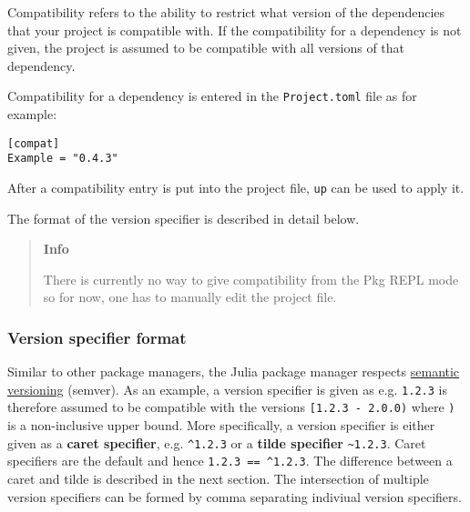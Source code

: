 Compatibility refers to the ability to restrict what version of the dependencies that your project is compatible with. If the compatibility for a dependency is not given, the project is assumed to be compatible with all versions of that dependency.



Compatibility for a dependency is entered in the \texttt{Project.toml} file as for example:




\begin{lstlisting}
[compat]
Example = "0.4.3"
\end{lstlisting}



After a compatibility entry is put into the project file, \texttt{up} can be used to apply it.



The format of the version specifier is described in detail below.



\begin{quote}
\textbf{Info}

There is currently no way to give compatibility from the Pkg REPL mode so for now, one has to manually edit the project file.

\end{quote}


\hypertarget{15488851848435252363}{}


\subsubsection{Version specifier format}



Similar to other package managers, the Julia package manager respects \href{https://semver.org/}{semantic versioning} (semver). As an example, a version specifier is given as e.g. \texttt{1.2.3} is therefore assumed to be compatible with the versions \texttt{[1.2.3 - 2.0.0)} where \texttt{)} is a non-inclusive upper bound. More specifically, a version specifier is either given as a \textbf{caret specifier}, e.g. \texttt{{\textasciicircum}1.2.3}  or a \textbf{tilde specifier} \texttt{{\textasciitilde}1.2.3}. Caret specifiers are the default and hence \texttt{1.2.3 == {\textasciicircum}1.2.3}. The difference between a caret and tilde is described in the next section. The intersection of multiple version specifiers can be formed by comma separating indiviual version specifiers.



